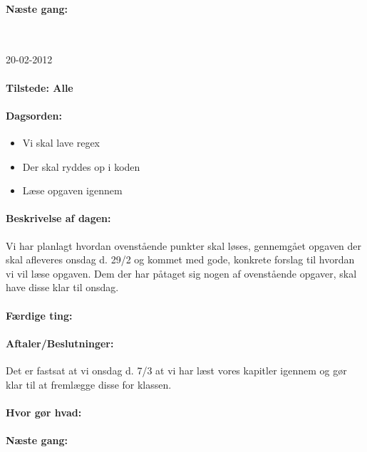 \documentclass[a4paper,10pt,titlepage]{article}
\begin{document}
			\paragraph{N\ae ste gang:}\mbox{}\\
			
			\begin{center}
		20-02-2012
		\end{center}
		\paragraph{Tilstede: Alle}
		\paragraph{Dagsorden:}
		\begin{itemize}
					\item Vi skal lave regex 
					\item Der skal ryddes op i koden
					\item L\ae se opgaven igennem
					 
		\end{itemize}
		
		\paragraph{Beskrivelse af dagen:}
		Vi har planlagt hvordan ovenst\aa ende punkter skal l\o ses, gennemg\aa et opgaven der skal afleveres onsdag d. 29/2 og kommet med gode, konkrete forslag til hvordan vi vil l\ae se opgaven.
Dem der har p\aa taget sig nogen af ovenst\aa ende opgaver, skal have disse klar til onsdag.

		\paragraph{F\ae rdige ting:}
		
		\paragraph{Aftaler/Beslutninger:}
		Det er fastsat at vi onsdag d. 7/3 at vi har l\ae st vores kapitler igennem og g\o r klar til at freml\ae gge disse for klassen.
		\paragraph{Hvor g\o r hvad:}
		
		\paragraph{N\ae ste gang:}\mbox{}\\
		
\end{document}
